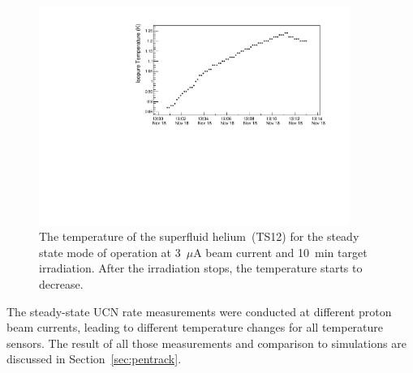 \begin{figure}[h!]
  \centering
  \includegraphics[width=0.9\textwidth]{UCNRate_temp.pdf}
  \caption{ The temperature of the superfluid helium~(TS12) for the
    steady state mode of operation at 3~$\mu$A beam current and 10~min
    target irradiation. After the irradiation stops, the temperature
    starts to decrease. }
  \label{fig:UCNRate_temp}
\end{figure}


The steady-state UCN rate measurements were conducted at different
proton beam currents, leading to different temperature changes for all
temperature sensors. The result of all those measurements and
comparison to simulations are discussed in Section~\ref{sec:pentrack}.








